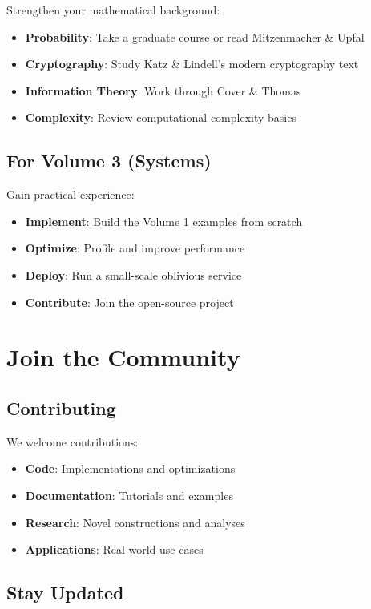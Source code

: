 Strengthen your mathematical background:
\begin{itemize}
\item \textbf{Probability}: Take a graduate course or read Mitzenmacher \& Upfal
\item \textbf{Cryptography}: Study Katz \& Lindell's modern cryptography text
\item \textbf{Information Theory}: Work through Cover \& Thomas
\item \textbf{Complexity}: Review computational complexity basics
\end{itemize}

\subsection{For Volume 3 (Systems)}

Gain practical experience:
\begin{itemize}
\item \textbf{Implement}: Build the Volume 1 examples from scratch
\item \textbf{Optimize}: Profile and improve performance
\item \textbf{Deploy}: Run a small-scale oblivious service
\item \textbf{Contribute}: Join the open-source project
\end{itemize}

\section{Join the Community}

\subsection{Contributing}

We welcome contributions:
\begin{itemize}
\item \textbf{Code}: Implementations and optimizations
\item \textbf{Documentation}: Tutorials and examples
\item \textbf{Research}: Novel constructions and analyses
\item \textbf{Applications}: Real-world use cases
\end{itemize}

\subsection{Stay Updated}

